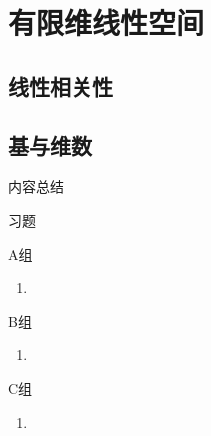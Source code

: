 \chapter{有限维线性空间}

\section{线性相关性}

\section{基与维数}

\vspace{2ex} 
\centerline{\heiti \Large 内容总结}

\vspace{2ex} 

\centerline{\heiti \Large 习题}
\vspace{2ex} 
{\kaishu }
\begin{flushright}
    \kaishu

\end{flushright}
\centerline{\heiti A组}
\begin{enumerate}
	\item 
\end{enumerate}
\centerline{\heiti B组}
\begin{enumerate}
	\item 
\end{enumerate}
\centerline{\heiti C组}
\begin{enumerate}
	\item 
\end{enumerate}